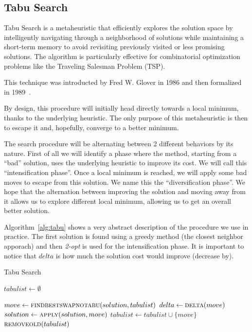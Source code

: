 \documentclass{article}
\begin{document}
\subsection{Tabu Search}
Tabu Search is a metaheuristic that efficiently explores the solution space by intelligently navigating through a neighborhood of solutions while maintaining a short-term memory to avoid revisiting previously visited or less promising solutions. The algorithm is particularly effective for combinatorial optimization problems like the Traveling Salesman Problem (TSP).

This technique was introducted by Fred W. Glover in 1986 and then formalized
in 1989~\cite{Glover:TabuSearch}.

By design, this procedure will initially head directly towards a local minimum, thanks to the underlying heuristic. The only purpose of this metaheuristic is then to escape it and, hopefully, converge to a better minimum.

The search procedure will be alternating between 2 different behaviors by its nature. First of all
we will identify a phase where the method, starting from a ``bad'' solution, uses the underlying
heuristic to improve its cost. We will call this ``intensification phase''. Once a local minimum is reached, we will apply some bad moves to escape from this solution. We name this the ``diversification phase''. We hope that the alternation between improving the solution and moving
away from it allows us to explore different local minimum, allowing us to get an overall better
solution.

Algorithm~\ref{alg:tabu} shows a very abstract description of the procedure we use in practice. The first solution is found using a greedy method (the closest neighbor apporach) and then \textit{2-opt} is used for the intensification phase. It is important to notice that $delta$ is
how much the solution cost would improve (decrease by).

\begin{algorithm}[ht]
\caption{Tabu Search}
\label{alg:tabu}
\begin{algorithmic}
    \State{}
    \State $tabulist \gets \emptyset$

        \State $move \gets \Call{findbestswapnotabu}{solution, tabulist}$
        \State $delta \gets \Call{delta}{move}$
        \State $solution \gets \Call{apply}{solution, move}$
          \State $tabulist \gets tabulist \cup \{move\}$
        \EndIf
        \State $\Call{removeold}{tabulist}$
    \EndWhile

  \EndProcedure

\end{algorithmic}
\end{algorithm}
\end{document}
